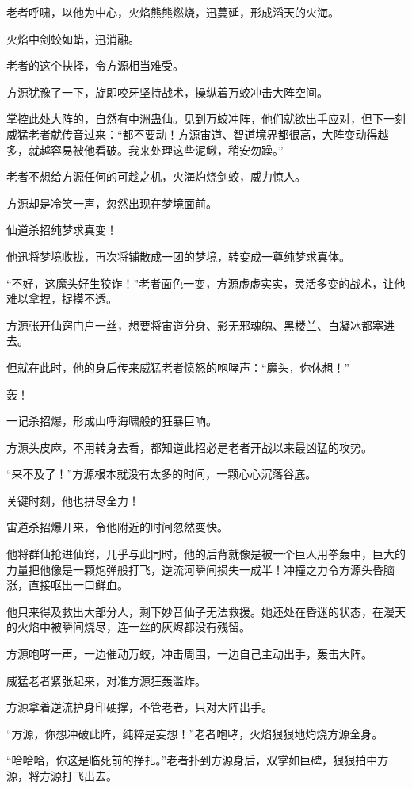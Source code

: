 \begin{this_body}
老者呼啸，以他为中心，火焰熊熊燃烧，迅蔓延，形成滔天的火海。

火焰中剑蛟如蜡，迅消融。

老者的这个抉择，令方源相当难受。

方源犹豫了一下，旋即咬牙坚持战术，操纵着万蛟冲击大阵空间。

掌控此处大阵的，自然有中洲蛊仙。见到万蛟冲阵，他们就欲出手应对，但下一刻威猛老者就传音过来：“都不要动！方源宙道、智道境界都很高，大阵变动得越多，就越容易被他看破。我来处理这些泥鳅，稍安勿躁。”

老者不想给方源任何的可趁之机，火海灼烧剑蛟，威力惊人。

方源却是冷笑一声，忽然出现在梦境面前。

仙道杀招纯梦求真变！

他迅将梦境收拢，再次将铺散成一团的梦境，转变成一尊纯梦求真体。

“不好，这魔头好生狡诈！”老者面色一变，方源虚虚实实，灵活多变的战术，让他难以拿捏，捉摸不透。

方源张开仙窍门户一丝，想要将宙道分身、影无邪魂魄、黑楼兰、白凝冰都塞进去。

但就在此时，他的身后传来威猛老者愤怒的咆哮声：“魔头，你休想！”

轰！

一记杀招爆，形成山呼海啸般的狂暴巨响。

方源头皮麻，不用转身去看，都知道此招必是老者开战以来最凶猛的攻势。

“来不及了！”方源根本就没有太多的时间，一颗心心沉落谷底。

关键时刻，他也拼尽全力！

宙道杀招爆开来，令他附近的时间忽然变快。

他将群仙抢进仙窍，几乎与此同时，他的后背就像是被一个巨人用拳轰中，巨大的力量把他像是一颗炮弹般打飞，逆流河瞬间损失一成半！冲撞之力令方源头昏脑涨，直接呕出一口鲜血。

他只来得及救出大部分人，剩下妙音仙子无法救援。她还处在昏迷的状态，在漫天的火焰中被瞬间烧尽，连一丝的灰烬都没有残留。

方源咆哮一声，一边催动万蛟，冲击周围，一边自己主动出手，轰击大阵。

威猛老者紧张起来，对准方源狂轰滥炸。

方源拿着逆流护身印硬撑，不管老者，只对大阵出手。

“方源，你想冲破此阵，纯粹是妄想！”老者咆哮，火焰狠狠地灼烧方源全身。

“哈哈哈，你这是临死前的挣扎。”老者扑到方源身后，双掌如巨碑，狠狠拍中方源，将方源打飞出去。


\end{this_body}
